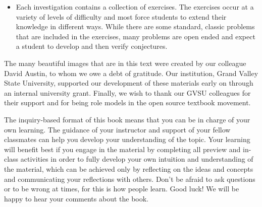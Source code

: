 \begin{itemize}
\item Each investigation contains a collection of exercises. The exercises occur at a variety of levels of difficulty and most force students to extend their knowledge in different ways. While there are some standard, classic problems that are included in the exercises, many problems are open ended and expect a student to develop and then verify conjectures.
\end{itemize}

\label{sec:pref_acknow}

The many beautiful images that are in this text were created by our colleague David Austin, to whom we owe a debt of gratitude. Our institution, Grand Valley State University, supported our development of these materials early on through an internal university grant. Finally, we wish to thank our GVSU colleagues for their support and for being role models in the open source textbook movement. 

\label{sec:pref_student}

The inquiry-based format of this book means that you can be in charge of your own learning. The guidance of your instructor and support of your fellow classmates can help you develop your understanding of the topic. Your learning will benefit best if you engage in the material by completing all preview and in-class activities in order to fully develop your own intuition and understanding of the material, which can be achieved only by reflecting on the ideas and concepts and communicating your reflections with others. Don't be afraid to ask questions or to be wrong at times, for this is how people learn. Good luck! We will be happy to hear your comments about the book.



